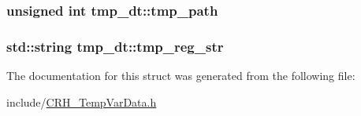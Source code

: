 \subsubsection[{tmp\+\_\+path}]{\setlength{\rightskip}{0pt plus 5cm}unsigned int tmp\+\_\+dt\+::tmp\+\_\+path\hspace{0.3cm}{\ttfamily [static]}}\label{structtmp__dt_a5133f5ea97efb23fde6f33ec7c8d454e}
\hypertarget{structtmp__dt_ae8a89114cd6dda550e3d1561f6fdc7a9}{}
\subsubsection[{tmp\+\_\+reg\+\_\+str}]{\setlength{\rightskip}{0pt plus 5cm}std\+::string tmp\+\_\+dt\+::tmp\+\_\+reg\+\_\+str\hspace{0.3cm}{\ttfamily [static]}}\label{structtmp__dt_ae8a89114cd6dda550e3d1561f6fdc7a9}


The documentation for this struct was generated from the following file\+:\begin{DoxyCompactItemize}
\item 
include/\hyperlink{_c_r_h___temp_var_data_8h}{C\+R\+H\+\_\+\+Temp\+Var\+Data.\+h}\end{DoxyCompactItemize}
